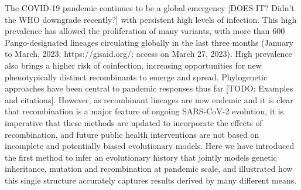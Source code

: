 \documentclass{article}
\begin{document}
The COVID-19 pandemic continues to be a global emergency [DOES IT? Didn't the
WHO downgrade recently?]
with persistent high levels of infection. This high prevalence has allowed the
proliferation of many variants, with more than 600 Pango-designated lineages
circulating globally in the last three months (January to March, 2023;
https://gisaid.org/; access on March 27, 2023). High prevalence also brings a
higher risk of coinfection, increasing opportunities for new phenotypically
distinct recombinants to emerge and spread. Phylogenetic approaches have
been central to pandemic responses thus far [TODO: Examples and citations].
However, as recombinant lineages are now endemic and it is clear that
recombination is a major feature of ongoing SARS-CoV-2 evolution,
it is imperative that these methods are updated to incorporate the
effects of recombination, and future public health interventions are
not based on incomplete and potentially biased evolutionary models.
Here we have introduced the first method to infer an evolutionary
history that jointly models genetic inheritance, mutation and
recombination at pandemic scale, and illustrated how this single
structure accurately captures results derived by many different means.
\end{document}
